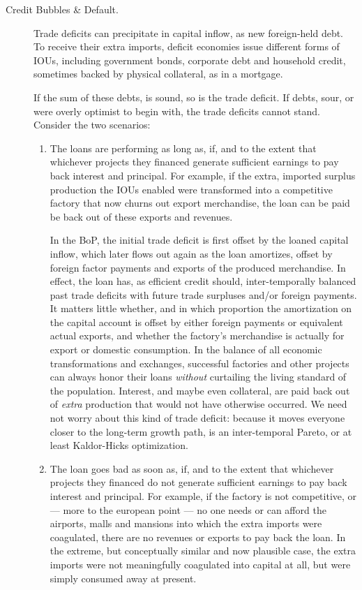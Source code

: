 \documentclass[11pt,a4paper,oneside,openright]{article}
\begin{document}
\begin{description}
	\item[Credit Bubbles \& Default.]  Trade deficits can precipitate in capital inflow, as new foreign-held debt. 
	To receive their extra imports, deficit economies issue different forms of IOUs, including government bonds, corporate debt and household credit, sometimes backed by physical collateral, as in a mortgage.%

	If the sum of these debts, is sound, so is the trade deficit. 
	If debts, sour, or were overly optimist to begin with, the trade deficits cannot stand. 
	Consider the two scenarios:
	\begin{enumerate}
		\item The loans are performing as long as, if, and to the extent that whichever projects they financed generate sufficient earnings to pay back interest and principal. 
		For example, if the extra, imported surplus production the IOUs enabled were transformed into a competitive factory that now churns out export merchandise, the loan can be paid be back out of these exports and revenues. 
		
		In the \gls{BoP}, the initial trade deficit is first offset by the loaned capital inflow, which later flows out again as the loan amortizes, offset by foreign factor payments and exports of the produced merchandise. 
		In effect, the loan has, as efficient credit should, inter-temporally balanced past trade deficits with future trade surpluses and/or foreign payments. 
		It matters little whether, and in which proportion the amortization on the capital account is offset by either foreign payments or equivalent actual exports, and whether the factory's merchandise is actually for export or domestic consumption. 
		In the balance of all economic transformations and exchanges, successful factories and other projects can always honor their loans \emph{without} curtailing the living standard of the population. 
		Interest, and maybe even collateral, are paid back out of \emph{extra} production that would not have otherwise occurred. 
		We need not worry about this kind of trade deficit: 
		because it moves everyone closer to the long-term growth path, is an inter-temporal Pareto, or at least Kaldor-Hicks optimization.

		\item The loan goes bad as soon as, if, and to the extent that whichever projects they financed do not generate sufficient earnings to pay back interest and principal. 
		For example, if the factory is not competitive, or --- more to the european point --- no one needs or can afford the airports, malls and mansions into which the extra imports were coagulated, there are no revenues or exports to pay back the loan. 
		In the extreme, but conceptually similar and now plausible case, the extra imports were not meaningfully coagulated into capital at all, but were simply consumed away at present.
		

\end{enumerate}
\end{description}
\end{document}
